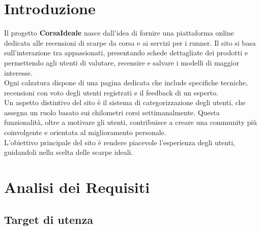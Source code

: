 \documentclass[a4paper, 12pt]{article}
\begin{document}
\begin{justify}
    

\section{Introduzione}

Il progetto \textbf{CorsaIdeale} nasce dall'idea di fornire una piattaforma online dedicata alle recensioni di scarpe da corsa e ai servizi per i runner. Il sito si basa sull'interazione tra appassionati, presentando schede dettagliate dei prodotti e permettendo agli utenti di valutare, recensire e salvare i modelli di maggior interesse.\\
Ogni calzatura dispone di una pagina dedicata che include specifiche tecniche, recensioni con voto degli utenti registrati e il feedback di un esperto.\\
Un aspetto distintivo del sito è il sistema di categorizzazione degli utenti, che assegna un ruolo basato sui chilometri corsi settimanalmente. Questa funzionalità, oltre a motivare gli utenti, contribuisce a creare una community più coinvolgente e orientata al miglioramento personale.\\ 
L'obiettivo principale del sito è rendere piacevole l'esperienza degli utenti, guidandoli nella scelta delle scarpe ideali.


\section{Analisi dei Requisiti}

\subsection{Target di utenza}


\end{justify}
\end{document}
